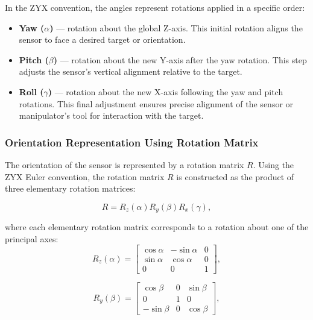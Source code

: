 \documentclass[12pt]{article}
\begin{document}
In the ZYX convention, the angles represent rotations applied in a specific order:
\begin{itemize}
    \item \textbf{Yaw (\(\alpha\))} — rotation about the global Z-axis. This initial rotation aligns the sensor to face a desired target or orientation.
    \item \textbf{Pitch (\(\beta\))} — rotation about the new Y-axis after the yaw rotation. This step adjusts the sensor's vertical alignment relative to the target.
    \item \textbf{Roll (\(\gamma\))} — rotation about the new X-axis following the yaw and pitch rotations. This final adjustment ensures precise alignment of the sensor or manipulator's tool for interaction with the target.
\end{itemize}

\subsubsection{Orientation Representation Using Rotation Matrix}

The orientation of the sensor is represented by a rotation matrix \(R\). Using the ZYX Euler convention, the rotation matrix \(R\) is constructed as the product of three elementary rotation matrices:

\begin{equation}
\label{eq:R_combined_task4}
R = R_z(\alpha) R_y(\beta) R_x(\gamma),
\end{equation}

where each elementary rotation matrix corresponds to a rotation about one of the principal axes:
\begin{equation}
\label{eq:Rz}
R_z(\alpha) =
\begin{bmatrix}
\cos\alpha & -\sin\alpha & 0 \\
\sin\alpha & \cos\alpha & 0 \\
0 & 0 & 1
\end{bmatrix},
\end{equation}

\begin{equation}
\label{eq:Ry}
R_y(\beta) =
\begin{bmatrix}
\cos\beta & 0 & \sin\beta \\
0 & 1 & 0 \\
-\sin\beta & 0 & \cos\beta
\end{bmatrix}, 
\end{equation}
\end{document}
